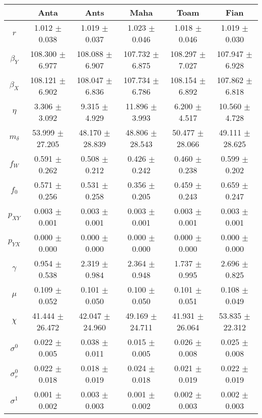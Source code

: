 \begin{sidewaystable}
\centering
\begin{tabular}{cccccc}
 & {\bf Anta} & {\bf Ants} & {\bf Maha} & {\bf Toam} & {\bf Fian} \\
\hline\hline
{\bf $r$} & 1.012 $\pm$ 0.038 & 1.019 $\pm$ 0.037 & 1.023 $\pm$ 0.046 & 1.018 $\pm$ 0.046 & 1.019 $\pm$ 0.030 \\
{\bf $\beta_Y$} & 108.300 $\pm$ 6.977 & 108.088 $\pm$ 6.907 & 107.732 $\pm$ 6.875 & 108.297 $\pm$ 7.027 & 107.947 $\pm$ 6.928 \\
{\bf $\beta_X$} & 108.121 $\pm$ 6.902 & 108.047 $\pm$ 6.836 & 107.734 $\pm$ 6.786 & 108.154 $\pm$ 6.892 & 107.862 $\pm$ 6.818 \\
{\bf $\eta$} & 3.306 $\pm$ 3.092 & 9.315 $\pm$ 4.929 & 11.896 $\pm$ 3.993 & 6.200 $\pm$ 4.517 & 10.560 $\pm$ 4.728 \\
{\bf $m_{\delta}$} & 53.999 $\pm$ 27.205 & 48.170 $\pm$ 28.839 & 48.806 $\pm$ 28.543 & 50.477 $\pm$ 28.066 & 49.111 $\pm$ 28.625 \\
{\bf $f_W$} & 0.591 $\pm$ 0.262 & 0.508 $\pm$ 0.212 & 0.426 $\pm$ 0.242 & 0.460 $\pm$ 0.238 & 0.599 $\pm$ 0.202 \\
{\bf $f_0$} & 0.571 $\pm$ 0.256 & 0.531 $\pm$ 0.258 & 0.356 $\pm$ 0.205 & 0.459 $\pm$ 0.243 & 0.659 $\pm$ 0.247 \\
{\bf $p_{XY}$} & 0.003 $\pm$ 0.001 & 0.003 $\pm$ 0.001 & 0.003 $\pm$ 0.001 & 0.003 $\pm$ 0.001 & 0.003 $\pm$ 0.001 \\
{\bf $p_{YX}$} & 0.000 $\pm$ 0.000 & 0.000 $\pm$ 0.000 & 0.000 $\pm$ 0.000 & 0.000 $\pm$ 0.000 & 0.000 $\pm$ 0.000 \\
{\bf $\gamma$} & 0.954 $\pm$ 0.538 & 2.319 $\pm$ 0.984 & 2.364 $\pm$ 0.948 & 1.737 $\pm$ 0.995 & 2.696 $\pm$ 0.825 \\
{\bf $\mu$} & 0.109 $\pm$ 0.052 & 0.101 $\pm$ 0.050 & 0.100 $\pm$ 0.050 & 0.101 $\pm$ 0.051 & 0.108 $\pm$ 0.049 \\
{\bf $\chi$} & 41.444 $\pm$ 26.472 & 42.047 $\pm$ 24.960 & 49.169 $\pm$ 24.711 & 41.931 $\pm$ 26.064 & 53.835 $\pm$ 22.312 \\
{\bf $\sigma^0$} & 0.022 $\pm$ 0.005 & 0.038 $\pm$ 0.011 & 0.015 $\pm$ 0.005 & 0.026 $\pm$ 0.008 & 0.025 $\pm$ 0.008 \\
{\bf $\sigma^0_r$} & 0.022 $\pm$ 0.018 & 0.018 $\pm$ 0.019 & 0.024 $\pm$ 0.018 & 0.021 $\pm$ 0.019 & 0.022 $\pm$ 0.019 \\
{\bf $\sigma^1$} & 0.001 $\pm$ 0.002 & 0.003 $\pm$ 0.003 & 0.001 $\pm$ 0.002 & 0.002 $\pm$ 0.003 & 0.002 $\pm$ 0.003 \\

\end{tabular}
\end{sidewaystable}

